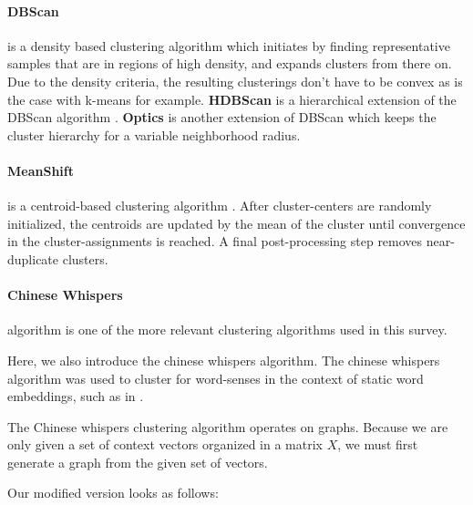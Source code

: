 \documentclass[a4paper,12pt,twoside,openright]{report}
\begin{document}
\paragraph{DBScan} is a density based clustering algorithm \cite{ester96} which initiates by finding representative samples that are in regions of high density, and expands clusters from there on.
Due to the density criteria, the resulting clusterings don't have to be convex as is the case with k-means for example. \textbf{HDBScan} is a hierarchical extension of the DBScan algorithm \cite{campello13}. \textbf{Optics} \cite{mihael99} is another extension of DBScan which keeps the cluster hierarchy for a variable neighborhood radius.

\paragraph{MeanShift} is a centroid-based clustering algorithm \cite{comaniciu02}.
After cluster-centers are randomly initialized, the centroids are updated by the mean of the cluster until convergence in the cluster-assignments is reached.
A final post-processing step removes near-duplicate clusters.

\paragraph{Chinese Whispers} algorithm is one of the more relevant clustering algorithms used in this survey. 


Here, we also introduce the chinese whispers algorithm.
The chinese whispers algorithm was used to cluster for word-senses in the context of static word embeddings, such as in
\cite{pelevina16}.

The Chinese whispers clustering algorithm operates on graphs.
Because we are only given a set of context vectors organized in a matrix $X$, we must first generate a graph from the given set of vectors.

Our modified version looks as follows:
\end{document}
